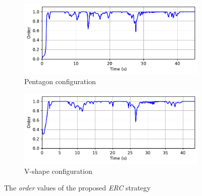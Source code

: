 \begin{figure}[!h]
\begin{subfigure}[b]{0.49\textwidth}
    
    \centering
    \includegraphics[width=\linewidth]{paper2/images/order_edc_shape1.pdf}
    \caption{Pentagon configuration}
    \label{fig:1order_edc1}
\end{subfigure}
\begin{subfigure}[b]{0.49\textwidth}
    \centering
    \includegraphics[width=\linewidth]{paper2/images/order_edc_shape2.pdf}
    \caption{V-shape configuration}
    \label{fig:1order_edc2}
\end{subfigure}
\caption{The \textit{order} values of the proposed \textit{ERC} strategy}
\label{fig:1order}
\end{figure}

